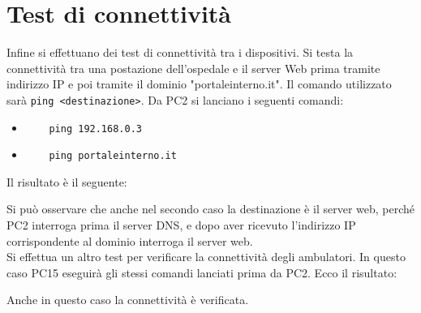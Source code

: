 \section{Test di connettività}
\hspace{24pt}Infine si effettuano dei test di connettività tra i dispositivi. Si testa la connettività tra una
postazione dell'ospedale e il server Web prima tramite indirizzo IP e poi tramite il dominio "portaleinterno.it".
Il comando utilizzato sarà \texttt{ping <destinazione>}. Da PC2 si lanciano i seguenti comandi:
\begin{itemize}
	\item \begin{verbatim}
	ping 192.168.0.3
	\end{verbatim}
	\item \begin{verbatim}
	ping portaleinterno.it
	\end{verbatim}
\end{itemize}
Il risultato è il seguente:
\vspace{10pt}
\begin{center}
\end{center}
\vspace{10pt}
Si può osservare che anche nel secondo caso la destinazione è il server web, perché PC2 interroga prima il server DNS,
e dopo aver ricevuto l'indirizzo IP corrispondente al dominio interroga il server web.\\
\hspace{24pt}Si effettua un altro test per verificare la connettività degli ambulatori. In questo caso PC15 eseguirà
gli stessi comandi lanciati prima da PC2. Ecco il risultato:
\vspace{10pt}
\begin{center}
\end{center}
\vspace{10pt}
Anche in questo caso la connettività è verificata.